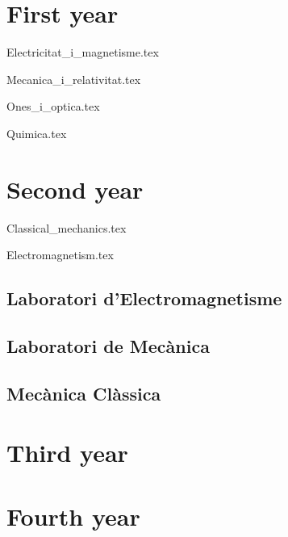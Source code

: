 \documentclass{article} %
\begin{document}
    \chapter{First year}
        {Electricitat_i_magnetisme.tex}
        \cleardoublepage
        
        {Mecanica_i_relativitat.tex}
        \cleardoublepage
        
        {Ones_i_optica.tex}
        \cleardoublepage
        
        {Quimica.tex}
        \cleardoublepage
    \chapter{Second year}
        {Classical_mechanics.tex}
        \cleardoublepage
        
        {Electromagnetism.tex}
        \cleardoublepage
        
        \section{Laboratori d'Electromagnetisme}
        \newpage
        \section{Laboratori de Mecànica}
        \newpage
        \section{Mecànica Clàssica}
    \chapter{Third year}
    \chapter{Fourth year}
\end{document}
